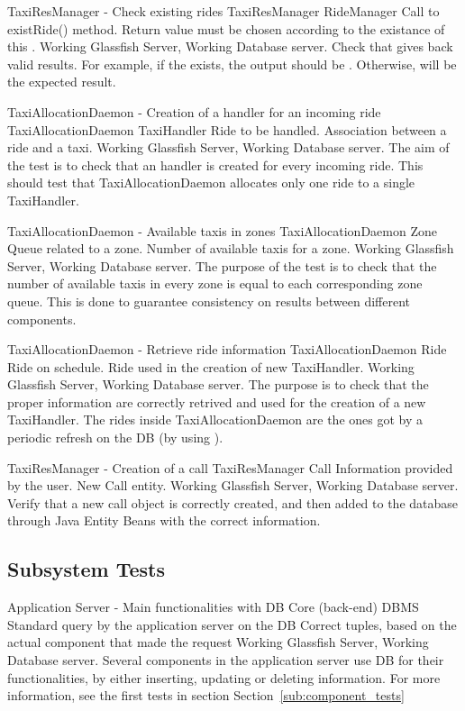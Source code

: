 \testx
{TaxiResManager - Check existing rides}
{TaxiResManager}
{RideManager}
{Call to existRide() method.}
{Return value must be chosen according to the existance of this .}
{Working Glassfish Server, Working Database server.}
{Check that  gives back valid results. For example, if
the  exists, the output should be . Otherwise,
 will be the expected result.}

\testx
{TaxiAllocationDaemon - Creation of a handler for an incoming ride}
{TaxiAllocationDaemon}
{TaxiHandler}
{Ride to be handled.}
{Association between a ride and a taxi.}
{Working Glassfish Server, Working Database server.}
{The aim of the test is to check that an handler is created for every incoming
ride. This should test that TaxiAllocationDaemon allocates only one ride to a single TaxiHandler.}

\testx
{TaxiAllocationDaemon - Available taxis in zones}
{TaxiAllocationDaemon}
{Zone}
{Queue related to a zone.}
{Number of available taxis for a zone.}
{Working Glassfish Server, Working Database server.}
{The purpose of the test is to check that the number of available taxis in every
zone is equal to each corresponding zone queue. This is done to guarantee consistency on results between different components.}

\testx
{TaxiAllocationDaemon - Retrieve ride information}
{TaxiAllocationDaemon}
{Ride}
{Ride on schedule.}
{Ride used in the creation of new TaxiHandler.}
{Working Glassfish Server, Working Database server.}
{The purpose is to check that the proper information are correctly retrived and
used for the creation of a new TaxiHandler. The rides inside TaxiAllocationDaemon are the ones got by a periodic refresh on the DB (by using ).}

\testx
{TaxiResManager - Creation of a call}
{TaxiResManager}
{Call}
{Information provided by the user.}
{New Call entity.}
{Working Glassfish Server, Working Database server.}
{Verify that a new call object is correctly created, and then added to the database through Java Entity Beans with the correct information.}

\subsection{Subsystem Tests} %
\label{sub:subsystem_tests}

\testx
{Application Server - Main functionalities with DB}
{Core (back-end)}
{DBMS}
{Standard query by the application server on the DB}
{Correct tuples, based on the actual component that made the request}
{Working Glassfish Server, Working Database server.}
{Several components in the application server use DB for their functionalities, by either inserting, updating or deleting information. For more information, see the first tests in section Section~\ref{sub:component_tests}}

